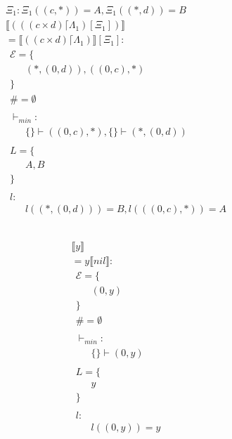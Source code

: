 \begin{align*} 
	 & \Xi_1: \Xi_1((c, *))=A, \Xi_1((*, d))=B & \\ 
	 & \llbracket (((c \times d) \lceil \Lambda_1) [\Xi_1]) \rrbracket & \\ 
	 & = \llbracket ((c \times d) \lceil \Lambda_1) \rrbracket [\Xi_1]:  & \\ 
	 & \ \ \mathcal{{E}}= \{  & \\ 
	 & \qquad (*, (0, d)), ((0, c), *) \\ 
	 & \ \ \} & \\ 
	 & \ \ \# = \emptyset & \\ 
	 & \ \  & \\ 
	 & \ \ \vdash_{{min}}: & \\ 
	 & \qquad \{  \} \vdash ((0, c), *), \{  \} \vdash (*, (0, d)) \\ 
	 & \ \  & \\ 
	 & \ \ L=\{ & \\ 
	 & \qquad A, B \\ 
	 & \ \ \} & \\ 
	 & \ \  & \\ 
	 & \ \ l: & \\ 
	 & \qquad l((*, (0, d))) = B, l(((0, c), *)) = A \\ 
	 & \ \  & \\ 
\end{align*} 

\begin{align*} 
	 &  & \\ 
	 & \llbracket y \rrbracket & \\ 
	 & = y\llbracket nil \rrbracket:  & \\ 
	 & \ \ \mathcal{{E}}= \{  & \\ 
	 & \qquad (0, y) \\ 
	 & \ \ \} & \\ 
	 & \ \ \# = \emptyset & \\ 
	 & \ \  & \\ 
	 & \ \ \vdash_{{min}}: & \\ 
	 & \qquad \{  \} \vdash (0, y) \\ 
	 & \ \  & \\ 
	 & \ \ L=\{ & \\ 
	 & \qquad y \\ 
	 & \ \ \} & \\ 
	 & \ \  & \\ 
	 & \ \ l: & \\ 
	 & \qquad l((0, y)) = y \\ 
	 & \ \  & \\ 
\end{align*} 

